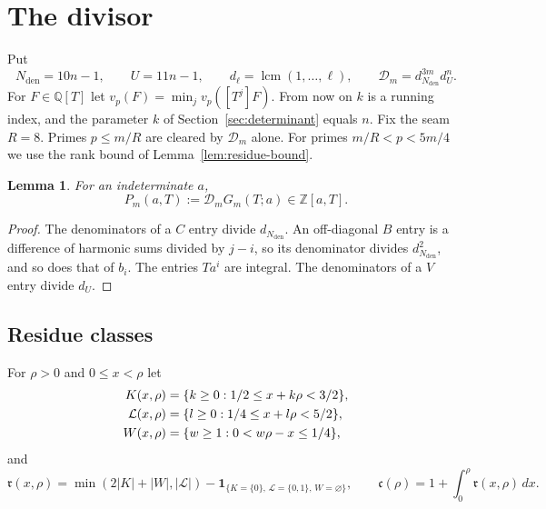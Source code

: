 \documentclass{amsart}
\newtheorem{lemma}{Lemma}[section]
\numberwithin{equation}{section}
\numberwithin{table}{section}
\newcommand{\Z}{\mathbb{Z}}
\newcommand{\Rseam}{8}
\begin{document}
\section{The divisor}\label{sec:divisor}
Put
\[
N_{\mathrm{den}}=10n-1,\qquad U=11n-1,\qquad d_\ell=\operatorname{lcm}(1,\ldots,\ell),
 \qquad \mathcal D_m=d_{N_{\mathrm{den}}}^{3m}d_U^n.
\]
For $F\in\mathbb Q[T]$ let $v_p(F)=\min_j v_p([T^j]F)$. From now on $k$ is
a running index, and the parameter $k$ of Section~\ref{sec:determinant} equals
$n$. Fix the seam $R=\Rseam$. Primes $p\le m/R$ are cleared by
$\mathcal D_m$ alone. For primes $m/R<p<5m/4$ we use the rank bound of
Lemma~\ref{lem:residue-bound}.

\begin{lemma}\label{lem:common-denominator}
For an indeterminate $a$,
\begin{equation}\label{eq:lcm-clearer}
 P_m(a,T):=\mathcal D_mG_m(T;a)\in\Z[a,T].
\end{equation}
\end{lemma}
\begin{proof}
The denominators of a $C$ entry divide $d_{N_{\mathrm{den}}}$. An off-diagonal $B$ entry is
a difference of harmonic sums divided by $j-i$, so its denominator divides
$d_{N_{\mathrm{den}}}^2$, and so does that of $b_i$. The entries $Ta^i$ are
integral. The denominators of a $V$ entry divide $d_U$.
\end{proof}

\subsection{Residue classes}
For $\rho>0$ and $0\le x<\rho$ let
\begin{align}\label{eq:residue-sets}
 K(x,\rho)&=\{k\ge0:1/2\le x+k\rho<3/2\},\\
 \mathcal L(x,\rho)&=\{l\ge0:1/4\le x+l\rho<5/2\},\notag
\\
 W(x,\rho)&=\{w\ge1:0<w\rho-x\le1/4\},\notag
\end{align}
and
\begin{equation}\label{eq:residue-rank}
 \mathfrak r(x,\rho)=\min(2|K|+|W|,|\mathcal L|)
       -\mathbf1_{\{K=\{0\},\,\mathcal L=\{0,1\},\,W=\varnothing\}},
 \qquad \mathfrak c(\rho)=1+\int_0^\rho \mathfrak r(x,\rho)\,dx.
\end{equation}
\end{document}
